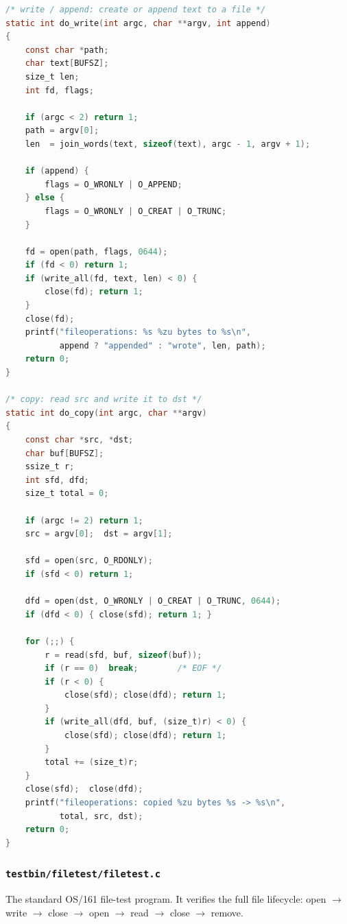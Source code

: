 \documentclass[11pt,a4paper]{article}
\begin{document}
\begin{lstlisting}[language=C,
  caption={\texttt{do\_write} / \texttt{do\_copy} --- create, write,
           append, and copy files through the syscall interface.}]
/* write / append: create or append text to a file */
static int do_write(int argc, char **argv, int append)
{
	const char *path;
	char text[BUFSZ];
	size_t len;
	int fd, flags;

	if (argc < 2) return 1;
	path = argv[0];
	len  = join_words(text, sizeof(text), argc - 1, argv + 1);

	if (append) {
		flags = O_WRONLY | O_APPEND;
	} else {
		flags = O_WRONLY | O_CREAT | O_TRUNC;
	}

	fd = open(path, flags, 0644);
	if (fd < 0) return 1;
	if (write_all(fd, text, len) < 0) {
		close(fd); return 1;
	}
	close(fd);
	printf("fileoperations: %s %zu bytes to %s\n",
	       append ? "appended" : "wrote", len, path);
	return 0;
}

/* copy: read src and write it to dst */
static int do_copy(int argc, char **argv)
{
	const char *src, *dst;
	char buf[BUFSZ];
	ssize_t r;
	int sfd, dfd;
	size_t total = 0;

	if (argc != 2) return 1;
	src = argv[0];  dst = argv[1];

	sfd = open(src, O_RDONLY);
	if (sfd < 0) return 1;

	dfd = open(dst, O_WRONLY | O_CREAT | O_TRUNC, 0644);
	if (dfd < 0) { close(sfd); return 1; }

	for (;;) {
		r = read(sfd, buf, sizeof(buf));
		if (r == 0)  break;        /* EOF */
		if (r < 0) {
			close(sfd); close(dfd); return 1;
		}
		if (write_all(dfd, buf, (size_t)r) < 0) {
			close(sfd); close(dfd); return 1;
		}
		total += (size_t)r;
	}
	close(sfd);  close(dfd);
	printf("fileoperations: copied %zu bytes %s -> %s\n",
	       total, src, dst);
	return 0;
}
\end{lstlisting}



\subsubsection*{\texttt{testbin/filetest/filetest.c}}
The standard OS/161 file-test program.  It verifies the full file
lifecycle: open $\to$ write $\to$ close $\to$ open $\to$ read $\to$
close $\to$ remove.
\end{document}
